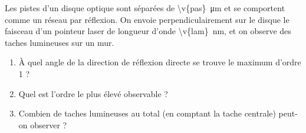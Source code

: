 Les pistes d'un disque optique sont séparées de \qty{\v{pas}}{\micro\metre} et se comportent comme un réseau par réflexion. On envoie perpendiculairement sur le disque le faisceau d'un pointeur laser de longueur d'onde \qty{\v{lam}}{nm}, et on observe des taches lumineuses sur un mur.

\begin{enumerate}[label=\alph*)]
    \item À quel angle de la direction de réflexion directe se trouve le maximum d'ordre 1 ?
    \item Quel est l'ordre le plus élevé observable ?
    \item Combien de taches lumineuses au total (en comptant la tache centrale) peut-on observer ?
\end{enumerate}
